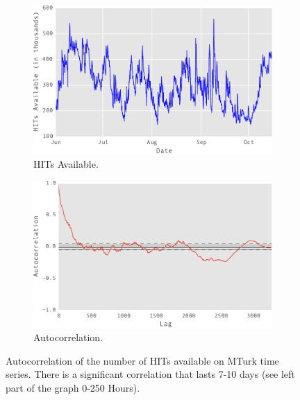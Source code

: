 \begin{figure}[tb]
    \centering
    \begin{subfigure}[b]{0.48\textwidth}
        \centering
        \includegraphics[width=\textwidth]{figures/out}
        \caption{HITs Available.}
        \label{fig:y equals x}
    \end{subfigure}
    \hfill
    \begin{subfigure}[b]{0.48\textwidth}
        \centering
        \includegraphics[width=\textwidth]{figures/out1}
        \caption{Autocorrelation.}
        \label{fig:three sin x}
    \end{subfigure}
    \hfill
    \caption{Autocorrelation of the number of HITs available on MTurk time series. There is a significant correlation that lasts 7-10 days (see left part of the graph 0-250 Hours).}
	\label{fig:autocorrelation1}
\end{figure}


